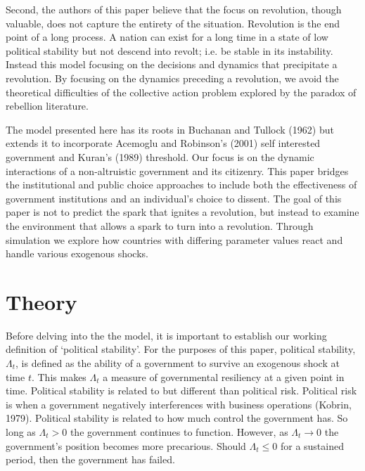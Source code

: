 \documentclass[12pt]{article}
\begin{document}
\begin{spacing}{1.5}
Second, the authors of this paper believe that the focus on revolution, though valuable, does not capture the entirety of the situation. Revolution is the end point of a long process. A nation can exist for a long time in a state of low political stability but not descend into revolt; i.e. be stable in its instability. Instead this model focusing on the decisions and dynamics that precipitate a revolution. By focusing on the dynamics preceding a revolution, we avoid the theoretical difficulties of the collective action problem explored by the paradox of rebellion literature.  

The model presented here has its roots in Buchanan and Tullock (1962) but extends it to incorporate Acemoglu and Robinson's (2001) self interested government and Kuran's (1989) threshold. Our focus is on the dynamic interactions of a non-altruistic government and its citizenry. This paper bridges the institutional and public choice approaches to include both the effectiveness of government institutions and an individual's choice to dissent. The goal of this paper is not to predict the spark that ignites a revolution, but instead to examine the environment that allows a spark to turn into a revolution. Through simulation we explore how countries with differing parameter values react and handle various exogenous shocks. 


\section{Theory}

Before delving into the the model, it is important to establish our working definition of `political stability'. For the purposes of this paper, political stability, $\Lambda_t$, is defined as the ability of a government to survive an exogenous shock at time $t$. This makes $\Lambda_t$ a measure of governmental resiliency at a given point in time. Political stability is related to but different than political risk. Political risk is when a government negatively interferences with business operations (Kobrin, 1979). Political stability is related to how much control the government has. So long as $\Lambda_t>0$ the government continues to function. However, as $\Lambda_t\rightarrow 0$ the government's position becomes more precarious. Should $\Lambda_t \leq 0$ for a sustained period, then the government has failed.  


\end{spacing}
\end{document}
